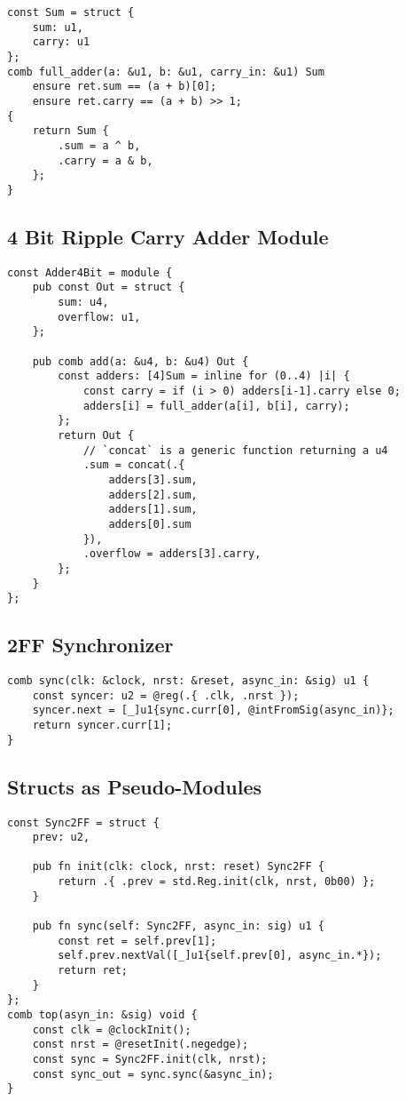 \documentclass[10pt]{article}
\begin{document}
\begin{verbatim}
const Sum = struct {
    sum: u1,
    carry: u1
};
comb full_adder(a: &u1, b: &u1, carry_in: &u1) Sum
    ensure ret.sum == (a + b)[0];
    ensure ret.carry == (a + b) >> 1;
{
    return Sum {
        .sum = a ^ b,
        .carry = a & b,
    };
}
\end{verbatim}

\subsection{4 Bit Ripple Carry Adder Module}

\begin{verbatim}
const Adder4Bit = module {
    pub const Out = struct {
        sum: u4,
        overflow: u1,
    };

    pub comb add(a: &u4, b: &u4) Out {
        const adders: [4]Sum = inline for (0..4) |i| {
            const carry = if (i > 0) adders[i-1].carry else 0;
            adders[i] = full_adder(a[i], b[i], carry);
        };
        return Out {
            // `concat` is a generic function returning a u4
            .sum = concat(.{
                adders[3].sum,
                adders[2].sum,
                adders[1].sum,
                adders[0].sum
            }),
            .overflow = adders[3].carry,
        };
    }
};
\end{verbatim}

\subsection{2FF Synchronizer}

\begin{verbatim}
comb sync(clk: &clock, nrst: &reset, async_in: &sig) u1 {
    const syncer: u2 = @reg(.{ .clk, .nrst });
    syncer.next = [_]u1{sync.curr[0], @intFromSig(async_in)};
    return syncer.curr[1];
}
\end{verbatim}

\subsection{Structs as Pseudo-Modules}

\begin{verbatim}
const Sync2FF = struct {
    prev: u2,

    pub fn init(clk: clock, nrst: reset) Sync2FF {
        return .{ .prev = std.Reg.init(clk, nrst, 0b00) };
    }

    pub fn sync(self: Sync2FF, async_in: sig) u1 {
        const ret = self.prev[1];
        self.prev.nextVal([_]u1{self.prev[0], async_in.*});
        return ret;
    }
};
comb top(asyn_in: &sig) void {
    const clk = @clockInit();
    const nrst = @resetInit(.negedge);
    const sync = Sync2FF.init(clk, nrst);
    const sync_out = sync.sync(&async_in);
}
\end{verbatim}
\end{document}
